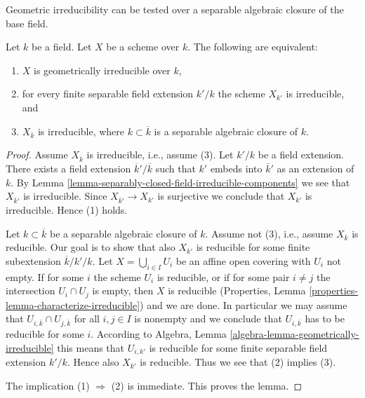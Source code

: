 \begin{lemma}
\label{lemma-characterize-geometrically-irreducible}
\begin{slogan}
Geometric irreducibility can be tested over a separable algebraic
closure of the base field.
\end{slogan}
Let $k$ be a field. Let $X$ be a scheme over $k$.
The following are equivalent:
\begin{enumerate}
\item $X$ is geometrically irreducible over $k$,
\item for every finite separable field extension $k'/k$
the scheme $X_{k'}$ is irreducible, and
\item $X_{\overline{k}}$ is irreducible, where $k \subset \overline{k}$
is a separable algebraic closure of $k$.
\end{enumerate}
\end{lemma}

\begin{proof}
Assume $X_{\overline{k}}$ is irreducible, i.e., assume (3).
Let $k'/k$ be a field extension.
There exists a field extension $\overline{k}'/\overline{k}$
such that $k'$ embeds into $\overline{k}'$ as an extension of $k$.
By Lemma \ref{lemma-separably-closed-field-irreducible-components}
we see that $X_{\overline{k}'}$ is irreducible.
Since $X_{\overline{k}'} \to X_{k'}$ is surjective we conclude
that $X_{k'}$ is irreducible. Hence (1) holds.

\medskip\noindent
Let $k \subset \overline{k}$ be a separable algebraic closure of $k$.
Assume not (3), i.e., assume $X_{\overline{k}}$ is reducible.
Our goal is to show that also $X_{k'}$ is
reducible for some finite subextension
$\overline{k}/k'/k$.
Let $X = \bigcup_{i \in I} U_i$ be an affine open covering
with $U_i$ not empty. If for some $i$ the scheme
$U_i$ is reducible, or if for some pair $i \not = j$ the
intersection $U_i \cap U_j$ is empty, then $X$ is reducible
(Properties, Lemma \ref{properties-lemma-characterize-irreducible})
and we are done.
In particular we may assume that
$U_{i, \overline{k}} \cap U_{j, \overline{k}}$ for all $i, j \in I$
is nonempty and we conclude that $U_{i, \overline{k}}$ has
to be reducible for some $i$. According to
Algebra, Lemma \ref{algebra-lemma-geometrically-irreducible}
this means that $U_{i, k'}$ is reducible for some
finite separable field extension $k'/k$.
Hence also $X_{k'}$ is reducible. Thus we see that
(2) implies (3).

\medskip\noindent
The implication (1) $\Rightarrow$ (2) is immediate.
This proves the lemma.
\end{proof}


